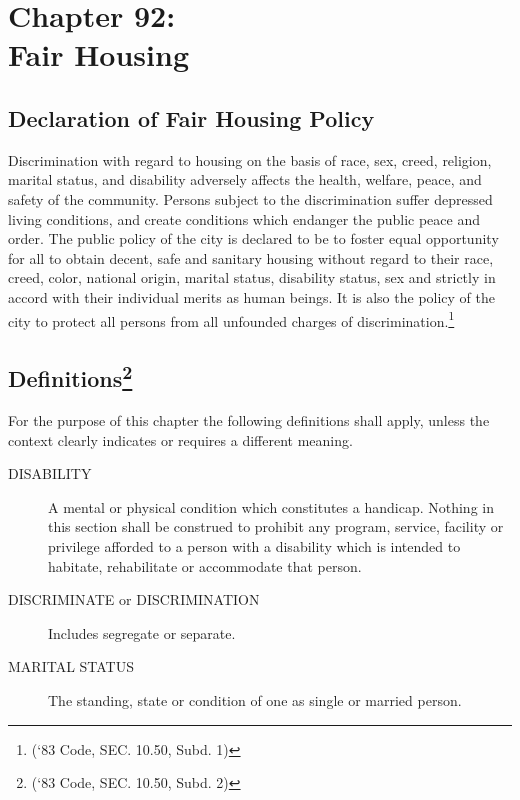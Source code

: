 \chapter*{Chapter 92: \\
	Fair Housing}
    \vfill
    \minitoc
    \pagebreak

\section{Declaration of Fair Housing Policy}
Discrimination with regard to housing on the basis of race, sex, creed, religion, marital status, and disability adversely affects the health, welfare, peace, and safety of the community.  Persons subject to the discrimination suffer depressed living conditions, and create conditions which endanger the public peace and order. The public policy of the city is declared to be to foster equal opportunity for all to obtain decent, safe and sanitary housing without regard to their race, creed, color, national origin, marital status, disability status, sex and strictly in accord with their individual merits as human beings. It is also the policy of the city to protect all persons from all unfounded charges of discrimination.\footnote{(‘83 Code, SEC. 10.50, Subd. 1)}

\section{Definitions\footnote{(‘83 Code, SEC. 10.50, Subd. 2)}}
For the purpose of this chapter the following definitions shall apply, unless the context clearly indicates or requires a different meaning.
\begin{description}
    \item[DISABILITY] A mental or physical condition which constitutes a handicap.  Nothing in this section shall be construed to prohibit any program, service, facility or privilege afforded to a person with a disability which is intended to habitate, rehabilitate or accommodate that person.
    \item[DISCRIMINATE or DISCRIMINATION] Includes segregate or separate.
    \item[MARITAL STATUS] The standing, state or condition of one as single or married person.
\end{description}

